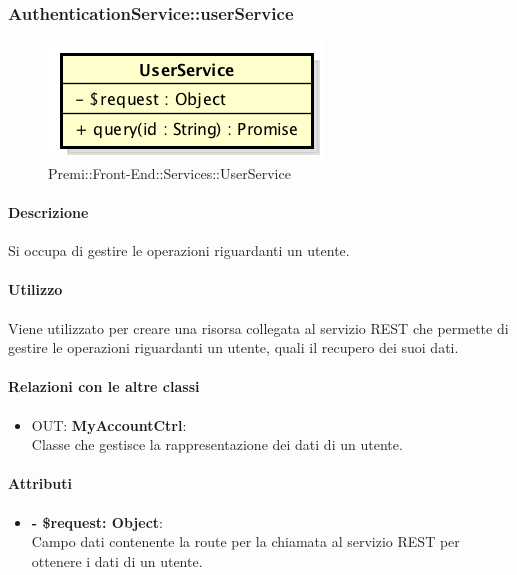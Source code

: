 		
		\subsubsection{AuthenticationService::userService}
		\begin{figure}[h]
			\centering
				\includegraphics[width=0.4\linewidth]{img/premi_front_end_services_userservice}
			\caption[Premi::Front-End::Services::UserService]{Premi::Front-End::Services::UserService}
		\end{figure}
		
		\paragraph{Descrizione}
		Si occupa di gestire le operazioni riguardanti un utente.
		
		\paragraph{Utilizzo}
		Viene utilizzato per creare una risorsa collegata al servizio \gls{REST} che permette di gestire le operazioni riguardanti un utente, quali il recupero dei suoi dati.
		
		\paragraph{Relazioni con le altre classi}
		\begin{itemize}
			\item OUT: \textbf{MyAccountCtrl}:\\
			Classe che gestisce la rappresentazione dei dati di un utente.
		\end{itemize}
		
		\paragraph{Attributi}
		\begin{itemize}
			\item \textbf{- \$request: Object}:\\
			Campo dati contenente la route per la chiamata al servizio \gls{REST} per ottenere i dati di un utente.
		\end{itemize}	
		
